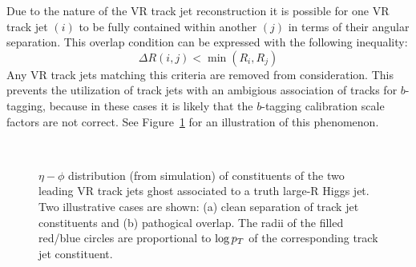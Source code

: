 Due to the nature of the VR track jet reconstruction it is possible for one VR track jet $(i)$ to be fully contained within another $(j)$ in terms of their angular separation.
This overlap condition can be expressed with the following inequality:
\begin{equation}
    \Delta R(i,j) < \min(R_i, R_j)
\end{equation}
Any VR track jets matching this criteria are removed from consideration.
This prevents the utilization of track jets with an ambigious association of tracks for $b$-tagging, because in these cases it is likely that the $b$-tagging calibration scale factors are not correct.
See Figure~\ref{fig:vr_contain} for an illustration of this phenomenon.

\begin{figure}[htbp!]
    \begin{center}
        \\
    \end{center}
    \caption{ $\eta-\phi$ distribution (from simulation) of constituents of the two leading \pt VR track jets ghost associated to a truth large-R Higgs jet.
        Two illustrative cases are shown: (a) clean separation of track jet constituents and (b) pathogical overlap.
        The radii of the filled red/blue circles are proportional to $\log{\ensuremath{p_{T}}}$ of the corresponding track jet constituent.
    }
    \label{fig:vr_contain}
\end{figure}

